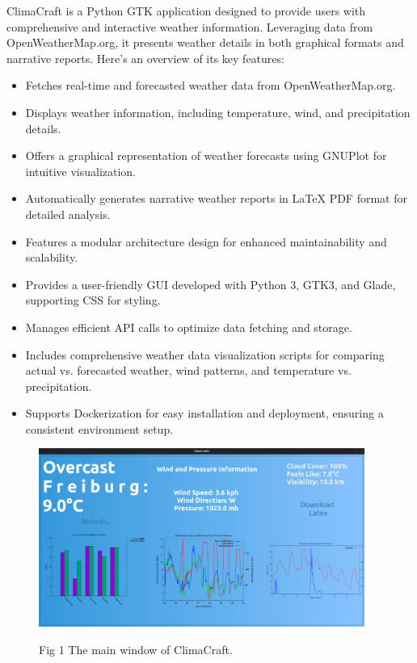 \documentclass[sn-mathphys-num]{sn-jnl}%
\begin{document}
ClimaCraft is a Python GTK application designed to provide users with comprehensive and interactive weather information. Leveraging data from OpenWeatherMap.org, it presents weather details in both graphical formats and narrative reports. Here's an overview of its key features:
\begin{itemize}
    \item Fetches real-time and forecasted weather data from OpenWeatherMap.org.
    \item Displays weather information, including temperature, wind, and precipitation details.
    \item Offers a graphical representation of weather forecasts using GNUPlot for intuitive visualization.
    \item Automatically generates narrative weather reports in LaTeX PDF format for detailed analysis.
    \item Features a modular architecture design for enhanced maintainability and scalability.
    \item Provides a user-friendly GUI developed with Python 3, GTK3, and Glade, supporting CSS for styling.
    \item Manages efficient API calls to optimize data fetching and storage.
    \item Includes comprehensive weather data visualization scripts for comparing actual vs. forecasted weather, wind patterns, and temperature vs. precipitation.
    \item Supports Dockerization for easy installation and deployment, ensuring a consistent environment setup.
\end{itemize}

\begin{figure}[htbp]
    \centering
    \includegraphics[width=0.95\textwidth]{Mainwindow.png}
    \parbox{\textwidth}{\centering Fig 1 The main window of ClimaCraft.}
    \label{fig:mainwindow}
\end{figure}
\end{document}
